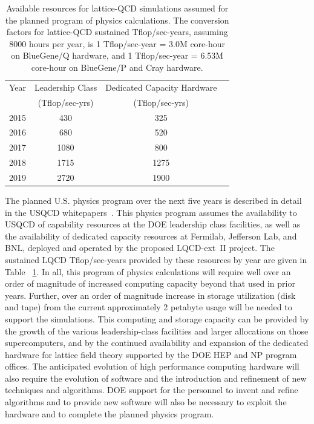 \begin{table}[t]
\begin{center}
\caption{Available resources for lattice-QCD simulations assumed for the planned program of physics calculations.  The conversion factors for lattice-QCD sustained
Tflop/sec-years, assuming 8000 hours per year, is 1 Tflop/sec-year = 3.0M core-hour on BlueGene/Q hardware, and 1 Tflop/sec-year = 6.53M core-hour on BlueGene/P and Cray hardware. \vspace{1.5mm}}
\label{tab:fiveyear}
\begin{tabular}{lccc}
\hline\hline  
Year & Leadership Class  & Dedicated Capacity Hardware  \\[-0.75mm] 
& (Tflop/sec-yrs) & (Tflop/sec-yrs) \\[0.5mm] \hline
2015 & 430 & 325 \\
2016 & 680 & 520 \\
2017 & 1080 & 800 \\
2018 & 1715 & 1275 \\ 
2019 & 2720 & 1900 \\ \hline\hline
\end{tabular}
\end{center}
\end{table}

The planned U.S. physics program over the next five years is described in detail
in the USQCD
whitepapers~\cite{USQCD_EF_whitepaper13,USQCD_IF_whitepaper13,USQCD_NP_whitepaper13,USQCD_Thermo_whitepaper13}.
This physics program assumes the availability to USQCD of capability resources
at the DOE leadership class facilities, as well as the availability of dedicated
capacity resources at Fermilab, Jefferson Lab, and BNL, deployed and operated
by the proposed LQCD-ext~II project.  The sustained LQCD Tflop/sec-years provided by
these resources by year are given in Table ~\ref{tab:fiveyear}. In all, this
program of physics calculations 
will require well over an order of magnitude of increased computing capacity
beyond that used in prior years.  Further, over an order of magnitude increase
in storage utilization (disk and tape) from the current approximately 2
petabyte usage will be needed to support the simulations.   This computing and
storage capacity can be provided by the growth
of the various leadership-class facilities and larger allocations on those
supercomputers, and by the continued availability and expansion of the
dedicated hardware for lattice field theory supported by the DOE HEP and NP
program offices.  The anticipated evolution of high performance computing
hardware will also require the evolution of software and the introduction and
refinement of new techniques and algorithms.  DOE support for the personnel to
invent and refine algorithms and to provide new software will also be necessary to
exploit the hardware and to complete the planned physics program.

